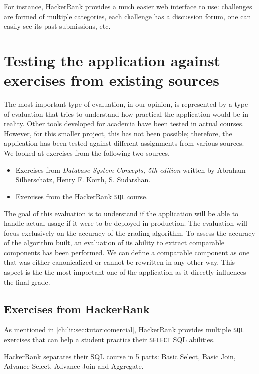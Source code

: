 For instance, HackerRank provides a much easier web interface to use: challenges are formed of multiple categories, each challenge has a discussion forum, one can easily see its past submissions, etc.

\section{Testing the application against exercises from existing sources}
The most important type of evaluation, in our opinion, is represented by a type of evaluation that tries to understand how practical the application would be in reality. Other tools developed for academia have been tested in actual courses. However, for this smaller project, this has not been possible; therefore, the application has been tested against different assignments from various sources. We looked at exercises from the following two sources.

\begin{itemize}
    \item Exercises from \textit{Database System Concepts, 5th edition} written by Abraham Silberschatz, Henry F. Korth, S. Sudarshan.
    \item Exercises from the HackerRank \texttt{SQL} course.
\end{itemize}

The goal of this evaluation is to understand if the application will be able to handle actual usage if it were to be deployed in production. The evaluation will focus exclusively on the accuracy of the grading algorithm. To assess the accuracy of the algorithm built, an evaluation of its ability to extract comparable components has been performed. We can define  a comparable component as one that was either canonicalized or cannot be rewritten in any other way. This aspect is the the most important one of the application as it directly influences the final grade.

\subsection{Exercises from HackerRank}

As mentioned in \ref{ch:lit:sec:tutor:comercial}, HackerRank provides multiple \texttt{SQL} exercises that can help a student practice their \texttt{SELECT} SQL abilities.

HackerRank separates their SQL course in 5 parts: Basic Select, Basic Join, Advance Select, Advance Join and Aggregate.

